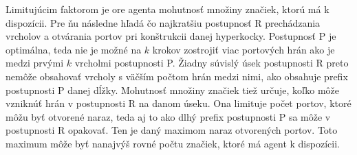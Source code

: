 Limitujúcim faktorom je ore agenta mohutnosť množiny značiek, ktorú má k
dispozícii. Pre ňu následne hľadá čo najkratšiu postupnosť R prechádzania
vrcholov a otvárania portov pri konštrukcii danej hyperkocky. Postupnosť P
je optimálna, teda nie je možné na $k$ krokov zostrojiť viac
portových hrán ako je medzi prvými $k$ vrcholmi postupnosti P. Žiadny
súvislý úsek postupnosti R preto nemôže obsahovať vrcholy s väčším počtom
hrán medzi nimi, ako obsahuje prefix postupnosti P danej dĺžky.
Mohutnosť množiny značiek tiež určuje, koľko môže vzniknúť hrán v
postupnosti R na danom úseku. Ona limituje počet portov, ktoré môžu byť 
otvorené
naraz, teda aj to ako dlhý prefix postupnosti P sa môže v postupnosti R
opakovať. Ten je daný maximom naraz otvorených portov. Toto maximum môže byť
nanajvýš rovné počtu značiek, ktoré má agent k dispozícii.


